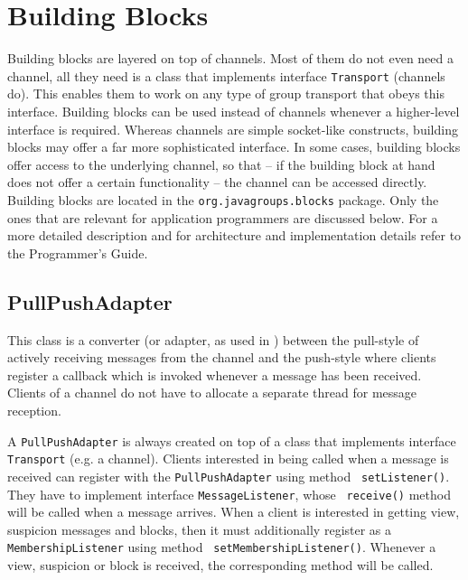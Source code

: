 
\chapter{Building Blocks} \label{BuildingBlocks}

Building blocks are layered on top of channels. Most of them do not even need a
channel, all they need is a class that implements interface {\tt Transport} (channels
do). This enables them to work on any type of group transport that obeys this
interface.  Building blocks can be used instead of channels whenever a higher-level
interface is required. Whereas channels are simple socket-like constructs, building
blocks may offer a far more sophisticated interface. In some cases, building blocks
offer access to the underlying channel, so that -- if the building block at hand does
not offer a certain functionality -- the channel can be accessed directly.  Building
blocks are located in the {\tt org.javagroups.blocks} package. Only the ones that are
relevant for application programmers are discussed below. For a more detailed
description and for architecture and implementation details refer to the Programmer's
Guide.



  \section{PullPushAdapter} \label{PullPushAdapter}

  This class is a converter (or adapter, as used in \cite{Gamma:1995}) between the
  pull-style of actively receiving messages from the channel and the push-style where
  clients register a callback which is invoked whenever a message has been
  received. Clients of a channel do not have to allocate a separate thread for
  message reception.

  A {\tt PullPushAdapter} is always created on top of a class that implements
  interface {\tt Transport} (e.g. a channel). Clients interested in being called when
  a message is received can register with the {\tt PullPushAdapter} using method {\tt
  setListener()}. They have to implement interface {\tt MessageListener}, whose {\tt
  receive()} method will be called when a message arrives. When a client is
  interested in getting view, suspicion messages and blocks, then it must
  additionally register as a {\tt MembershipListener} using method {\tt
  setMembershipListener()}. Whenever a view, suspicion or block is received, the
  corresponding method will be called.

